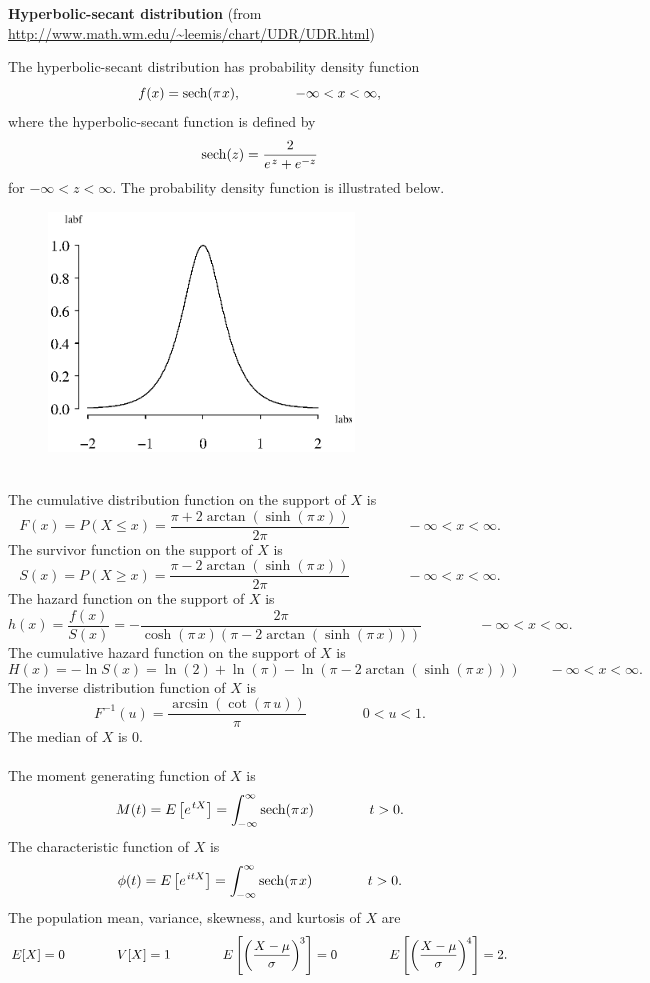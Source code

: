 \documentclass[12pt,fullpage]{article}
\begin{document}
\noindent
{\bf Hyperbolic-secant distribution} (from \color{blue}\url{http://www.math.wm.edu/~leemis/chart/UDR/UDR.html}\color{black})

\noindent
The hyperbolic-secant distribution has probability density function 
$$
f(x) ={\rm sech}(\pi \kern 0.08 em x), \qquad \qquad -\infty<x<\infty,
$$where the hyperbolic-secant function is defined by $${\rm sech}(z)=\frac{2}{e^{\kern 0.08 em z}+e^{-z}}$$ for $-\infty < z < \infty$. The probability density function is illustrated below.
{\begin{figure}[h!]
\begin{center}
\includegraphics[width=3.2in]{HyperbolicsecantPlot.ps}
\end{center}
\end{figure}}\\
The cumulative distribution function on
the support of $X$ is
$$
F(x) = P(X \leq x)= \frac{\pi +2\arctan(\sinh(\pi\, x))}{2\pi} \qquad \qquad -\infty<x<\infty.
$$
The survivor function on the support of $X$ is
$$
S(x) = P(X \geq x) =\frac{\pi - 2\arctan(\sinh(\pi\, x))}{2\pi} \qquad \qquad -\infty<x<\infty.
$$
The hazard function on the support of $X$ is
$$
h(x) = \frac{f(x)}{S(x)} = -\frac{2\pi}{\cosh(\pi \, x)(\pi -2\arctan(\sinh(\pi\, x)))} \qquad \qquad -\infty<x<\infty.
$$
The cumulative hazard function on the support of $X$ is
$$
H(x) = - \ln S(x) = \ln(2) + \ln(\pi) -\ln(\pi-2\arctan(\sinh(\pi \, x))) \qquad -\infty<x<\infty.
$$
The inverse distribution function of $X$ is
$$
F ^ {-1}(u) = \frac{\arcsin(\cot(\pi\, u))}{\pi} \qquad \qquad 0 < u < 1.
$$
The median of $X$ is 0.\\
\\
The moment generating function of $X$ is
$$
M(t) = E\left[ e ^ {\kern 0.08 em tX} \right] = \displaystyle \int_{\kern -0.08 em -\infty}^{\infty} {\rm sech}(\pi \kern 0.08 em x) \qquad \qquad t > 0.
$$
The characteristic function of $X$ is
$$
\phi(t) = E\left[ e ^ {\kern 0.08 em itX} \right] = \displaystyle \int_{\kern -0.08 em -\infty}^{\infty} {\rm sech}(\pi \kern 0.08 em x) \qquad \qquad t > 0.
$$
The population mean, variance, skewness, and kurtosis of $X$ are
$$
E[X] =0 \qquad \qquad 
V[X] = 1 \qquad \qquad 
E\left[ \left( \frac{X - \mu}{\sigma} \right) ^ {\kern -0.08 em 3} \right] = 0 \qquad \qquad 
E\left[ \left( \frac{X - \mu}{\sigma} \right) ^ {\kern -0.08 em 4} \right] = 2.
$$
\vspace{0.1in}
\end{document}
